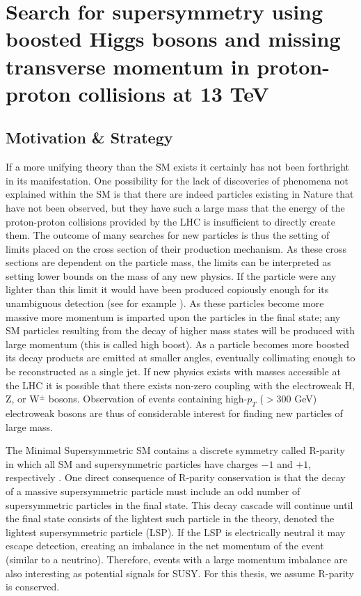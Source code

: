 \chapter{Search for supersymmetry using boosted Higgs bosons and missing transverse momentum in proton-proton collisions at 13 TeV}
\label{chap:analysis}

\section{Motivation \& Strategy}
\label{sec:mot}

If a more unifying theory than the SM exists it certainly has not been forthright in its manifestation. One possibility for the lack of discoveries of phenomena not explained within the SM is that there are indeed particles existing in Nature that have not been observed, but they have such a large mass that the energy of the proton-proton collisions provided by the LHC is insufficient to directly create them. The outcome of many searches for new particles is thus the setting of limits placed on the cross section of their production mechanism. As these cross sections are dependent on the particle mass, the limits can be interpreted as setting lower bounds on the mass of any new physics. If the particle were any lighter than this limit it would have been produced copiously enough for its unambiguous detection (see for example \cite{CMS-SUS-16-033, CMS-SUS-15-002}). As these particles become more massive more momentum is imparted upon the particles in the final state; any SM particles resulting from the decay of higher mass states will be produced with large momentum (this is called high boost). As a particle becomes more boosted its decay products are emitted at smaller angles, eventually collimating enough to be reconstructed as a single jet. If new physics exists with masses accessible at the LHC it is possible that there exists non-zero coupling with the electroweak H, Z, or W$^{\pm}$ bosons. Observation of events containing high-$p_{T}$ ($>$300 GeV) electroweak bosons are thus of considerable interest for finding new particles of large mass.

The Minimal Supersymmetric SM contains a discrete symmetry called R-parity in which all SM and supersymmetric particles have charges ${-1}$ and ${+1}$, respectively \cite{susyprimer}. One direct consequence of R-parity conservation is that the decay of a massive supersymmetric particle must include an odd number of supersymmetric particles in the final state. This decay cascade will continue until the final state consists of the lightest such particle in the theory, denoted the lightest supersymmetric particle (LSP). If the LSP is electrically neutral it may escape detection, creating an imbalance in the net momentum of the event (similar to a neutrino). Therefore, events with a large momentum imbalance are also interesting as potential signals for SUSY. For this thesis, we assume R-parity is conserved.

